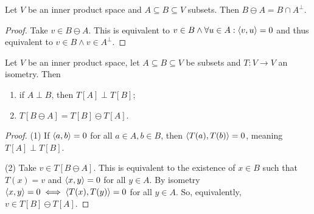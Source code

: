 \begin{lemma} \label{ominusSubspace}
Let $V$ be an inner product space and $A\subseteq B \subseteq V$ subsets. Then $B\ominus A = B\cap A^\perp$.
\end{lemma}
\begin{proof}
Take $v\in B\ominus A$. This is equivalent to $v\in B \land \forall u\in A: \left\langle v,u \right\rangle =0$ and thus equivalent to $v\in B \land v\in A^\perp$.
\end{proof}

\begin{proposition} \label{perpUnderIsometry}
Let $V$ be an inner product space, let $A\subseteq B\subseteq V$ be subsets and $T:V\to V$ an isometry. Then
\begin{enumerate}
\item if $A\perp B$, then $T[A]\perp T[B]$;
\item $T[B\ominus A] = T[B]\ominus T[A]$.
\end{enumerate}
\end{proposition}
\begin{proof}
(1) If $\left\langle a,b \right\rangle=0$ for all $a\in A, b\in B$, then $\left\langle T(a), T(b) \right\rangle =0$, meaning $T[A]\perp T[B]$.

(2) Take $v\in T[B\ominus A]$. This is equivalent to the existence of $x\in B$ such that $T(x) = v$ and $\left\langle x,y \right\rangle=0$ for all $y\in A$. By isometry $\left\langle x,y \right\rangle=0 \iff \left\langle T(x), T(y) \right\rangle=0$ for all $y\in A$. So, equivalently, $v\in T[B]\ominus T[A]$. 
\end{proof}

